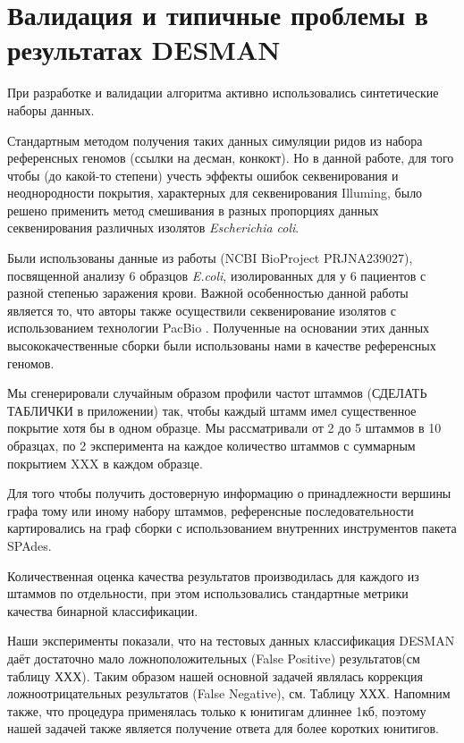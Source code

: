 \documentclass{spbau-diploma}
\begin{document}
\section{Валидация и типичные проблемы в результатах DESMAN}

При разработке и валидации алгоритма активно использовались синтетические наборы данных. 

Стандартным методом получения таких данных симуляции ридов из набора референсных геномов (ссылки на десман, конкокт).
Но в данной работе, для того чтобы (до какой-то степени) учесть эффекты ошибок секвенирования и неоднородности покрытия, характерных для секвенирования Illuming, было решено применить метод смешивания в разных пропорциях данных секвенирования различных изолятов \textit{Escherichia coli}. 

Были использованы данные из работы \cite{isolates} (NCBI BioProject PRJNA239027), посвященной анализу 6 образцов \textit{E.coli}, изолированных для у 6 пациентов с разной степенью заражения крови. Важной особенностью данной работы является то, что авторы также осуществили секвенирование изолятов с использованием технологии PacBio . Полученные на основании этих данных высококачественные сборки были использованы нами в качестве референсных геномов.

Мы сгенерировали случайным образом профили частот штаммов (СДЕЛАТЬ ТАБЛИЧКИ в приложении) так, чтобы каждый штамм имел существенное покрытие хотя бы в одном образце. Мы рассматривали от 2 до 5 штаммов в 10 образцах, по 2 эксперимента на каждое количество штаммов с суммарным покрытием XXX в каждом образце.

Для того чтобы получить достоверную информацию о принадлежности вершины графа тому или иному набору штаммов, референсные последовательности картировались на граф сборки с использованием внутренних инструментов пакета SPAdes.

Количественная оценка качества результатов производилась для каждого из штаммов по отдельности, при этом использовались стандартные метрики качества бинарной классификации.

Наши эксперименты показали, что на тестовых данных классификация DESMAN даёт достаточно мало ложноположительных (False Positive) результатов(см таблицу ХХХ). Таким образом нашей основной задачей являлась коррекция ложноотрицательных результатов (False Negative), см. Таблицу ХХХ. Напомним также, что процедура применялась только к юнитигам длиннее 1кб, поэтому нашей задачей также является получение ответа для более коротких юнитигов. 
\end{document}
